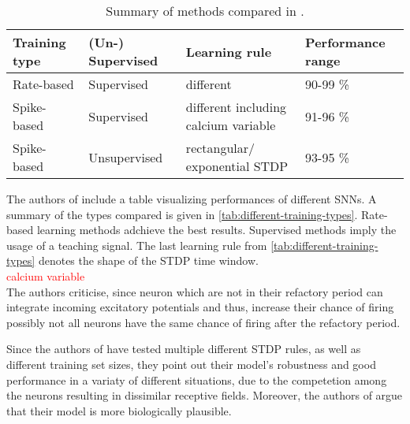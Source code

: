 \begin{table}[]
    \begin{tabular}{|l|l|l|l|}
    \hline
    \textbf{Training type} & \textbf{(Un-) Supervised}    & \textbf{Learning rule}               & \textbf{Performance range} \\ \hline
    Rate-based             & Supervised                   & different                            & 90-99 \%                   \\ \hline
    Spike-based            & Supervised                   & different including calcium variable & 91-96 \%                   \\ \hline
    Spike-based            & Unsupervised                 & rectangular/ exponential \ac{STDP}        & 93-95 \%                   \\ \hline
    \end{tabular}
    \caption{Summary of methods compared in \cite{SNN}.}
    \label{tab:different-training-types}
\end{table}

The authors of \cite{SNN} include a table visualizing performances of different \acp{SNN}.
A summary of the types compared is given in \autoref{tab:different-training-types}.
Rate-based learning methods adchieve the best results.
Supervised methods imply the usage of a teaching signal.
The last learning rule from \autoref{tab:different-training-types} denotes the shape of the \ac{STDP} time window.
\textcolor{red}{\\calcium variable\\}
The authors criticise, since neuron which are not in their refactory period can integrate incoming excitatory potentials and thus, 
increase their chance of firing possibly not all neurons have the same chance of firing after the refactory period.

Since the authors of \cite{SNN} have tested multiple different \ac{STDP} rules, as well as different training set sizes, 
they point out their model's robustness and good performance in a variaty of different situations, 
due to the competetion among the neurons resulting in dissimilar receptive fields.
Moreover, the authors of \cite{SNN} argue that their model is more biologically plausible.